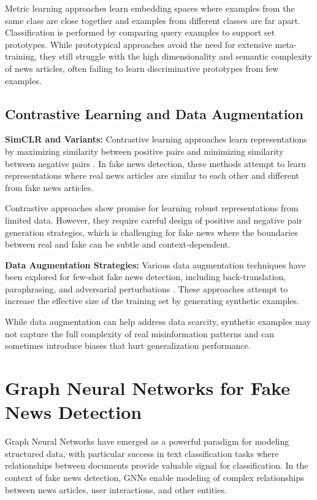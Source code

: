 Metric learning approaches learn embedding spaces where examples from the same class are close together and examples from different classes are far apart. Classification is performed by comparing query examples to support set prototypes. While prototypical approaches avoid the need for extensive meta-training, they still struggle with the high dimensionality and semantic complexity of news articles, often failing to learn discriminative prototypes from few examples.

\subsection{Contrastive Learning and Data Augmentation}

\textbf{SimCLR and Variants:} Contrastive learning approaches learn representations by maximizing similarity between positive pairs and minimizing similarity between negative pairs \cite{chen2020simple, gao2021simcse}. In fake news detection, these methods attempt to learn representations where real news articles are similar to each other and different from fake news articles.

Contrastive approaches show promise for learning robust representations from limited data. However, they require careful design of positive and negative pair generation strategies, which is challenging for fake news where the boundaries between real and fake can be subtle and context-dependent.

\textbf{Data Augmentation Strategies:} Various data augmentation techniques have been explored for few-shot fake news detection, including back-translation, paraphrasing, and adversarial perturbations \cite{longpre2020effective, kumar2020data}. These approaches attempt to increase the effective size of the training set by generating synthetic examples.

While data augmentation can help address data scarcity, synthetic examples may not capture the full complexity of real misinformation patterns and can sometimes introduce biases that hurt generalization performance.

\section{Graph Neural Networks for Fake News Detection}

Graph Neural Networks have emerged as a powerful paradigm for modeling structured data, with particular success in text classification tasks where relationships between documents provide valuable signal for classification. In the context of fake news detection, GNNs enable modeling of complex relationships between news articles, user interactions, and other entities.

